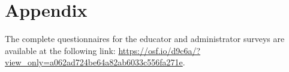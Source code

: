 \appendix
\section{Appendix}
\label{app:study1ques}
\label{app:study2ques}
The complete questionnaires for the educator and administrator surveys are available at the following link: \url{https://osf.io/d9c6a/?view_only=a062ad724be64a82ab6033c556fa271e}.




